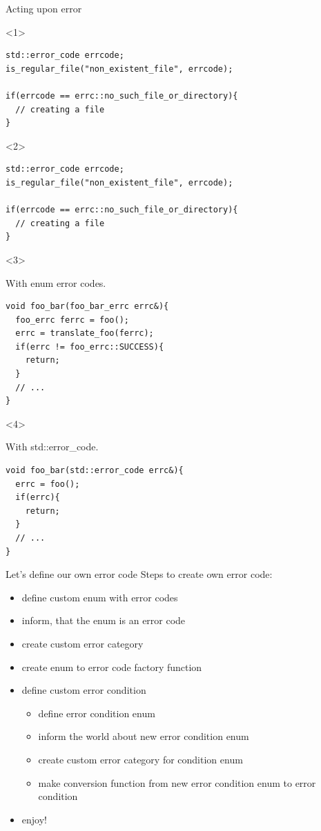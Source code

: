\documentclass[10pt]{beamer}
\begin{document}
\begin{frame}[fragile]{Acting upon error}
	\begin{onlyenv}
	\begin{verbatim}
std::error_code errcode;
is_regular_file("non_existent_file", errcode);
  
if(errcode == errc::no_such_file_or_directory){
  // creating a file
}
	\end{verbatim}
	\end{onlyenv}

	\begin{onlyenv}
	\begin{verbatim}
std::error_code errcode;
is_regular_file("non_existent_file", errcode);
  
if(errcode == errc::no_such_file_or_directory){
  // creating a file
}
	\end{verbatim}
	\end{onlyenv}

	\begin{onlyenv}
	\centerline{With enum error codes.}
	\vfill
	\begin{verbatim}
void foo_bar(foo_bar_errc errc&){
  foo_errc ferrc = foo();
  errc = translate_foo(ferrc);
  if(errc != foo_errc::SUCCESS){
    return;
  }
  // ...
}
	\end{verbatim}
	\end{onlyenv}

	\begin{onlyenv}
	\centerline{With std::error\_code.}
	\vfill
	\begin{verbatim}
void foo_bar(std::error_code errc&){
  errc = foo();
  if(errc){
    return;
  }
  // ...
}
	\end{verbatim}
	\end{onlyenv}

\end{frame}

\begin{frame}{Let's define our own error code}
	Steps to create own error code:
	\begin{itemize}[<+- | alert@+>]
		\item define custom enum with error codes
		\item inform, that the enum is an error code
		\item create custom error category
		\item create enum to error code factory function
		\item define custom error condition
		\begin{itemize}
			\item define error condition enum
			\item inform the world about new error condition enum
			\item create custom error category for condition enum
			\item make conversion function from new error condition enum to error condition
		\end{itemize}
		\item enjoy!
	\end{itemize}
\end{frame}
\end{document}
